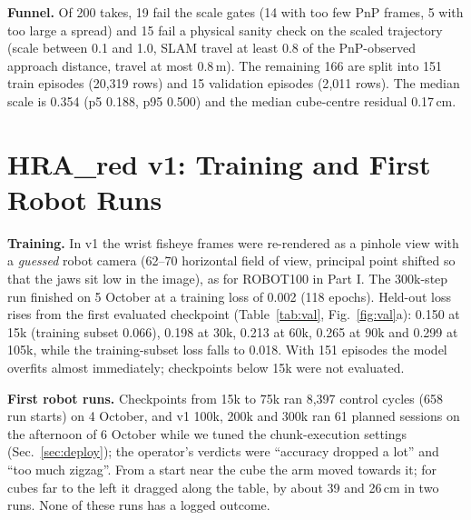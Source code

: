\documentclass[conference,10pt]{IEEEtran}
\begin{document}
\textbf{Funnel.} Of 200 takes, 19 fail the scale gates (14 with too few PnP frames, 5 with too large a spread) and 15 fail a
physical sanity check on the scaled trajectory (scale between 0.1 and 1.0, SLAM travel at least 0.8 of the PnP-observed
approach distance, travel at most 0.8\,m). The remaining 166 are split into 151 train episodes (20{,}319 rows) and 15
validation episodes (2{,}011 rows). The median scale is 0.354 (p5 0.188, p95 0.500) and the median cube-centre residual 0.17\,cm.

\section{HRA\_red v1: Training and First Robot Runs}\label{sec:v1}
\textbf{Training.} In v1 the wrist fisheye frames were re-rendered as a pinhole view with a \emph{guessed} robot camera
(62--70\textdegree{} horizontal field of view, principal point shifted so that the jaws sit low in the image), as for
ROBOT100 in Part I. The 300k-step run finished on 5 October at a training loss of 0.002 (118 epochs). Held-out loss rises from
the first evaluated checkpoint (Table~\ref{tab:val}, Fig.~\ref{fig:val}a): 0.150 at 15k (training subset 0.066), 0.198 at 30k,
0.213 at 60k, 0.265 at 90k and 0.299 at 105k, while the training-subset loss falls to 0.018. With 151 episodes the model
overfits almost immediately; checkpoints below 15k were not evaluated.

\begin{table}[t]
\centering\footnotesize\setlength{\tabcolsep}{3pt}
\caption{Held-out loss (masked MSE on the 9 supervised dimensions) by checkpoint; training-subset loss in parentheses.}
\label{tab:val}
\end{table}

\textbf{First robot runs.} Checkpoints from 15k to 75k ran 8{,}397 control cycles (658 run starts) on 4 October, and v1 100k,
200k and 300k ran 61 planned sessions on the afternoon of 6 October while we tuned the chunk-execution settings
(Sec.~\ref{sec:deploy}); the operator's verdicts were ``accuracy dropped a lot'' and ``too much zigzag''. From a start near
the cube the arm moved towards it; for cubes far to the left it dragged along the table, by about 39 and 26\,cm in two runs.
None of these runs has a logged outcome.
\end{document}
